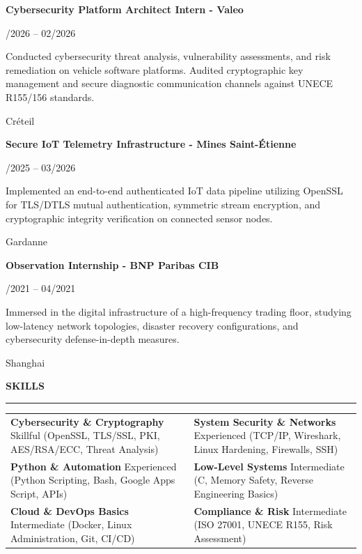 \documentclass[10pt,a4paper]{article}
\newcommand{\cvSection}[1]{%
  \vspace{6.5pt}%
  {\fontsize{10.5}{12}\selectfont \textbf{#1}}\par\vspace{1.5pt}%
  \rule{\textwidth}{0.75pt}\par\vspace{4.5pt}%
}
\newcommand{\cvItem}[4]{%
  \noindent
  \parbox[t]{0.75\textwidth}{\raggedright \textbf{#1}}\hfill
  \parbox[t]{0.24\textwidth}{\raggedleft \fontsize{8.5}{10.5}\selectfont #2}\par
  \vspace{1.5pt}
  \noindent
  \parbox[t]{0.75\textwidth}{\fontsize{8.7}{11.2}\selectfont #4}\hfill
  \parbox[t]{0.24\textwidth}{\raggedleft \fontsize{8.5}{10.5}\selectfont #3}\par
  \vspace{5pt}
}
\begin{document}
\cvItem{Cybersecurity Platform Architect Intern - Valeo}{01/2026 -- 02/2026}{Créteil}{Conducted cybersecurity threat analysis, vulnerability assessments, and risk remediation on vehicle software platforms. Audited cryptographic key management and secure diagnostic communication channels against UNECE R155/156 standards.}

\cvItem{Secure IoT Telemetry Infrastructure - Mines Saint-Étienne}{10/2025 -- 03/2026}{Gardanne}{Implemented an end-to-end authenticated IoT data pipeline utilizing OpenSSL for TLS/DTLS mutual authentication, symmetric stream encryption, and cryptographic integrity verification on connected sensor nodes.}

\cvItem{Observation Internship - BNP Paribas CIB}{04/2021 -- 04/2021}{Shanghai}{Immersed in the digital infrastructure of a high-frequency trading floor, studying low-latency network topologies, disaster recovery configurations, and cybersecurity defense-in-depth measures.}

\cvSection{SKILLS}
\begin{tabularx}{\textwidth}{@{}X X@{}}
  \textbf{Cybersecurity \& Cryptography} \newline
  {\fontsize{8.5}{10.5}\selectfont Skillful (OpenSSL, TLS/SSL, PKI, AES/RSA/ECC, Threat Analysis)} &
  \textbf{System Security \& Networks} \newline
  {\fontsize{8.5}{10.5}\selectfont Experienced (TCP/IP, Wireshark, Linux Hardening, Firewalls, SSH)} \\[4.5pt]
  
  \textbf{Python \& Automation} \newline
  {\fontsize{8.5}{10.5}\selectfont Experienced (Python Scripting, Bash, Google Apps Script, APIs)} &
  \textbf{Low-Level Systems} \newline
  {\fontsize{8.5}{10.5}\selectfont Intermediate (C, Memory Safety, Reverse Engineering Basics)} \\[4.5pt]
  
  \textbf{Cloud \& DevOps Basics} \newline
  {\fontsize{8.5}{10.5}\selectfont Intermediate (Docker, Linux Administration, Git, CI/CD)} &
  \textbf{Compliance \& Risk} \newline
  {\fontsize{8.5}{10.5}\selectfont Intermediate (ISO 27001, UNECE R155, Risk Assessment)}
\end{tabularx}
\end{document}
